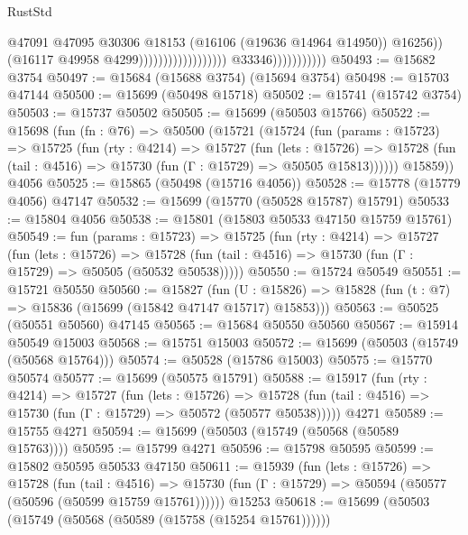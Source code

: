 \begin{lexlean}{RustStd}
\begin{coremodule}
                                                                @47091
                                                                @47095
                                                                @30306
                                                                @18153
                                                                (@16106 (@19636 @14964 @14950))
                                                                @16256))
                                                            (@16117 @49958 @4299))))))))))))))))))
                          @33346)))))))))))
@50493 := @15682 @3754
@50497 := @15684 (@15688 @3754) (@15694 @3754)
@50498 := @15703 @47144
@50500 := @15699 (@50498 @15718)
@50502 := @15741 (@15742 @3754)
@50503 := @15737 @50502
@50505 := @15699 (@50503 @15766)
@50522 := @15698
    (fun (fn : @76) =>
    @50500
      (@15721
        (@15724
          (fun (params : @15723) =>
          @15725
            (fun (rty : @4214) =>
            @15727
              (fun (lets : @15726) =>
              @15728 (fun (tail : @4516) => @15730 (fun (Γ : @15729) => @50505 @15813))))))
        @15859))
    @4056
@50525 := @15865 (@50498 (@15716 @4056))
@50528 := @15778 (@15779 @4056) @47147
@50532 := @15699 (@15770 (@50528 @15787) @15791)
@50533 := @15804 @4056
@50538 := @15801 (@15803 @50533 @47150 @15759 @15761)
@50549 := fun (params : @15723) =>
  @15725
    (fun (rty : @4214) =>
    @15727
      (fun (lets : @15726) =>
      @15728 (fun (tail : @4516) => @15730 (fun (Γ : @15729) => @50505 (@50532 @50538)))))
@50550 := @15724 @50549
@50551 := @15721 @50550
@50560 := @15827
    (fun (U : @15826) => @15828 (fun (t : @7) => @15836 (@15699 (@15842 @47147 @15717) @15853)))
@50563 := @50525 (@50551 @50560) @47145
@50565 := @15684 @50550 @50560
@50567 := @15914 @50549 @15003
@50568 := @15751 @15003
@50572 := @15699 (@50503 (@15749 (@50568 @15764)))
@50574 := @50528 (@15786 @15003)
@50575 := @15770 @50574
@50577 := @15699 (@50575 @15791)
@50588 := @15917
    (fun (rty : @4214) =>
    @15727
      (fun (lets : @15726) =>
      @15728 (fun (tail : @4516) => @15730 (fun (Γ : @15729) => @50572 (@50577 @50538)))))
    @4271
@50589 := @15755 @4271
@50594 := @15699 (@50503 (@15749 (@50568 (@50589 @15763))))
@50595 := @15799 @4271
@50596 := @15798 @50595
@50599 := @15802 @50595 @50533 @47150
@50611 := @15939
    (fun (lets : @15726) =>
    @15728
      (fun (tail : @4516) =>
      @15730 (fun (Γ : @15729) => @50594 (@50577 (@50596 (@50599 @15759 @15761))))))
    @15253
@50618 := @15699 (@50503 (@15749 (@50568 (@50589 (@15758 (@15254 @15761))))))

\end{coremodule}
\end{lexlean}
